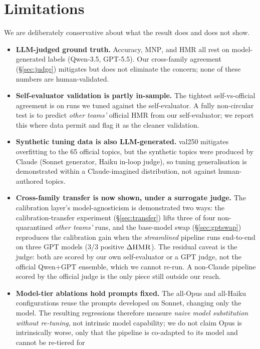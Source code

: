 \documentclass[sigconf,nonacm]{acmart}
\newcommand{\HMR}{\textsc{HMR}}
\newcommand{\MNP}{\textsc{MNP}}
\begin{document}
\section{Limitations}
\label{sec:limits}
We are deliberately conservative about what the result does and does not show.
\begin{itemize}
  \item \textbf{LLM-judged ground truth.} Accuracy, \MNP, and \HMR{} all rest on
    model-generated labels (Qwen-3.5, GPT-5.5). Our cross-family agreement (\S\ref{sec:judge})
    mitigates but does not eliminate the concern; none of these numbers are human-validated.
  \item \textbf{Self-evaluator validation is partly in-sample.} The tightest self-vs-official
    agreement is on runs we tuned against the self-evaluator. A fully non-circular test is
    to predict \emph{other teams'} official \HMR{} from our self-evaluator; we report this
    where data permit and flag it as the cleaner validation.
  \item \textbf{Synthetic tuning data is also LLM-generated.} val250 mitigates overfitting
    to the 65 official topics, but the synthetic topics were produced by Claude (Sonnet
    generator, Haiku in-loop judge), so tuning generalisation is demonstrated within a
    Claude-imagined distribution, not against human-authored topics.
  \item \textbf{Cross-family transfer is now shown, under a surrogate judge.} The calibration
    layer's model-agnosticism is demonstrated two ways: the calibration-transfer experiment
    (\S\ref{sec:transfer}) lifts three of four non-quarantined \emph{other teams'} runs, and the base-model
    swap (\S\ref{sec:gptswap}) reproduces the calibration gain when the \emph{streamlined}
    pipeline runs end-to-end on three GPT models (3/3 positive $\Delta\HMR$). The residual caveat is the judge:
    both are scored by our own self-evaluator or a GPT judge, not the official Qwen$+$GPT
    ensemble, which we cannot re-run. A non-Claude pipeline scored by the official judge is
    the only piece still outside our reach.
  \item \textbf{Model-tier ablations hold prompts fixed.} The all-Opus and all-Haiku
    configurations reuse the prompts developed on Sonnet, changing only the model. The
    resulting regressions therefore measure \emph{naive model substitution without
    re-tuning}, not intrinsic model capability; we do not claim Opus is intrinsically
    worse, only that the pipeline is co-adapted to its model and cannot be re-tiered for

\end{itemize}
\end{document}

